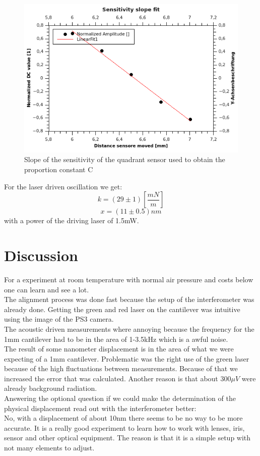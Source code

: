 \documentclass[12pt,a4paper]{article}
\begin{document}
\begin{multicols}{2}

\begin{figure}[H]
	\centering
	\includegraphics[scale=1.4]{../figures/Slopeofsensitivityofthesensor.png}
	\caption{Slope of the sensitivity of the quadrant sensor used to obtain the proportion constant C}
	\label{fig:sensorsensitivity}
\end{figure}

For the laser driven oscillation we get:
$$k = (29 \pm 1) [\frac{mN}{m}]$$
$$x = (11 \pm 0.5) nm$$
with a power of the driving laser of 1.5mW.


\section{Discussion}
For a experiment at room temperature with normal air pressure and costs below  one can learn and see a lot. \\
The alignment process was done fast because the setup of the interferometer was already done. Getting the green and red laser on the cantilever was intuitive using the image of the PS3 camera. \\
The acoustic driven measurements where annoying because the frequency for the 1mm cantilever had to be in the area of 1-3.5kHz which is a awful noise.\\
The result of some nanometer displacement is in the area of what we were expecting of a 1mm cantilever. Problematic was the right use of the green laser because of the high fluctuations between measurements. Because of that we increased the error that was calculated. Another reason is that about 300$\mu V$ were already background radiation.\\
Answering the optional question if we could make the determination of the physical displacement read out with the interferometer better:\\
No, with a displacement of about 10nm there seems to be no way to be more accurate. It is a really good experiment to learn how to work with lenses, iris, sensor and other optical equipment. The reason is that it is a simple setup with not many elements to adjust.





\end{multicols}
\end{document}
